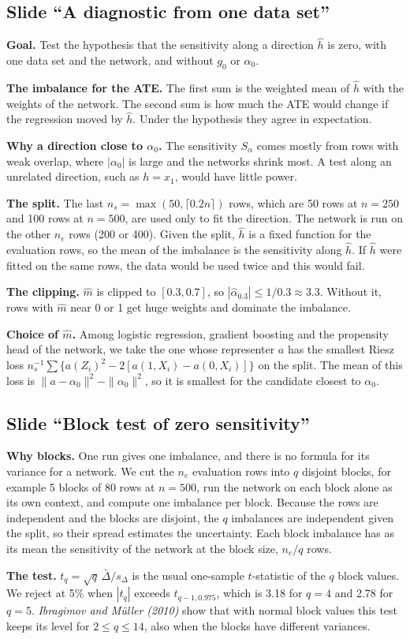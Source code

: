 \documentclass[10pt]{article}
\newcommand{\slide}[1]{\subsection*{Slide ``#1''}}
\begin{document}
\slide{A diagnostic from one data set}
\textbf{Goal.} Test the hypothesis that the sensitivity along a direction $\hat h$ is zero, with one data set and the
network, and without $g_0$ or $\alpha_0$.

\textbf{The imbalance for the ATE.} The first sum is the weighted mean of $\hat h$ with the weights of the network. The
second sum is how much the ATE would change if the regression moved by $\hat h$. Under the hypothesis they agree in
expectation.

\textbf{Why a direction close to $\alpha_0$.} The sensitivity $S_\alpha$ comes mostly from rows with weak overlap, where
$|\alpha_0|$ is large and the networks shrink most. A test along an unrelated direction, such as $h=x_1$, would have
little power.

\textbf{The split.} The last $n_s=\max(50,\lceil 0.2n\rceil)$ rows, which are 50 rows at $n=250$ and 100 rows at
$n=500$, are used only to fit the direction. The network is run on the other $n_e$ rows (200 or 400). Given the split,
$\hat h$ is a fixed function for the evaluation rows, so the mean of the imbalance is the sensitivity along $\hat h$.
If $\hat h$ were fitted on the same rows, the data would be used twice and this would fail.

\textbf{The clipping.} $\hat m$ is clipped to $[0.3,0.7]$, so $|\hat\alpha_{0.3}|\le1/0.3\approx3.3$. Without it, rows
with $\hat m$ near 0 or 1 get huge weights and dominate the imbalance.

\textbf{Choice of $\hat m$.} Among logistic regression, gradient boosting and the propensity head of the network, we take
the one whose representer $a$ has the smallest Riesz loss $n_s^{-1}\sum\{a(Z_i)^2-2[a(1,X_i)-a(0,X_i)]\}$ on the
split. The mean of this loss is $\|a-\alpha_0\|^2-\|\alpha_0\|^2$, so it is smallest for the candidate closest to
$\alpha_0$.

\slide{Block test of zero sensitivity}
\textbf{Why blocks.} One run gives one imbalance, and there is no formula for its variance for a network. We cut the
$n_e$ evaluation rows into $q$ disjoint blocks, for example 5 blocks of 80 rows at $n=500$, run the network on each
block alone as its own context, and compute one imbalance per block. Because the rows are independent and the blocks
are disjoint, the $q$ imbalances are independent given the split, so their spread estimates the uncertainty.
Each block imbalance has as its mean the sensitivity of the network at the block size, $n_e/q$ rows.

\textbf{The test.} $t_q=\sqrt q\,\bar\Delta/s_\Delta$ is the usual one-sample $t$-statistic of the $q$ block values. We
reject at 5\% when $|t_q|$ exceeds $t_{q-1,0.975}$, which is 3.18 for $q=4$ and 2.78 for $q=5$.
\textit{Ibragimov and M\"uller (2010)} show that with normal block values this test keeps its level for $2\le q\le14$,
also when the blocks have different variances.
\end{document}
